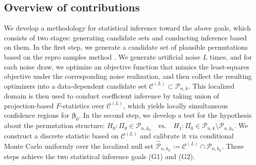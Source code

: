 \documentclass[11pt, reqno]{amsart}
\renewcommand{\hat}{\widehat}
\newcommand{\mC}{\mathcal{C}}
\newcommand{\mP}{\mathcal{P}}
\newcommand{\1}{\mbox{1}\hspace{-0.25em}\mbox{l}}
\theoremstyle{definition}\newtheorem{problem}{Problem}[section]
\theoremstyle{definition}\newtheorem{definition}[problem]{Definition}
\theoremstyle{remark}\newtheorem{assumption}{Assumption}
\theoremstyle{remark}\newtheorem{remark}[problem]{Remark}
\theoremstyle{definition}\newtheorem{example}[problem]{Example}
\theoremstyle{plain}\newtheorem{theorem}[problem]{Theorem}
\theoremstyle{plain}\newtheorem{question}[problem]{Question}
\theoremstyle{plain}\newtheorem{lemma}[problem]{Lemma}
\theoremstyle{plain}\newtheorem{proposition}[problem]{Proposition}
\theoremstyle{plain}\newtheorem{corollary}[problem]{Corollary}
\theoremstyle{plain}\newtheorem{conjecture}[problem]{Conjecture}
\begin{document}
\subsection{Overview of contributions}
We develop a methodology for statistical inference toward the above goals, which consists of two stages: generating candidate sets and conducting inference based on them.
In the first step, we generate a candidate set of plausible permutations based on the repro samples method \citep{xie2022repro,xie2024repro}. We generate artificial noise $L$ times, and for each noise draw, we optimize an objective function that mimics the least-squares objective under the corresponding noise realization, and then collect the resulting optimizers into a data-dependent candidate set $\mathcal{C}^{(L)}\subset\mathcal{P}_{n,k}$. This localized domain is then used to conduct coefficient inference by taking union of projection-based $F$-statistics over $\mathcal{C}^{(L)}$, which yields locally simultaneous confidence regions for $\bm{\beta}_0$.
In the second step, we develop a test for the hypothesis about the permutation structure: $H_0:\Pi_0\in\mP_{n,k_0}\quad\text{vs.}\quad H_1:\Pi_0\in\mP_{n,k}\setminus\mP_{n,k_0}$. We construct a discrete statistic based on $\mC^{(L)}$ and calibrate it via conditional Monte Carlo uniformly over the localized null set $\hat{\mP}_{n,k_0}:=\mC^{(L)}\cap\mP_{n,k_0}$. These steps achieve the two statistical inference goals (G1) and (G2).
\end{document}
